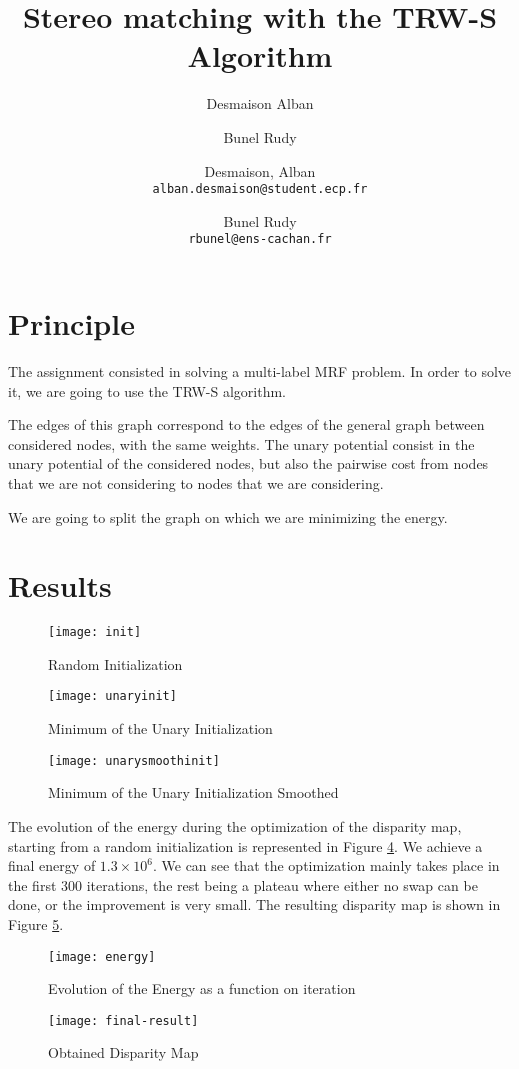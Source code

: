 \documentclass [11pt]{article}
\title{Stereo matching with the TRW-S Algorithm}
\author{Desmaison Alban \and Bunel Rudy}
\author{
  Desmaison, Alban\\
  \texttt{alban.desmaison@student.ecp.fr}
  \and
  Bunel Rudy\\
  \texttt{rbunel@ens-cachan.fr}
}
\begin{document}
\maketitle


\section{Principle}
The assignment consisted in solving a multi-label MRF problem. In order to solve it, we are going to use the TRW-S algorithm.

The edges of this graph correspond to the edges of the general graph between considered nodes, with the same weights. The unary potential consist in the unary potential of the considered nodes, but also the pairwise cost from nodes that we are not considering to nodes that we are considering.

 We are going to split the graph on which we are minimizing the energy.

\section{Results}

\begin{figure}[htbp]
  \centering
  \texttt{[image: init]}
  \caption{Random Initialization}
  \label{fig:randominit}
\end{figure}

\begin{figure}[htbp]
  \centering
  \texttt{[image: unaryinit]}
  \caption{Minimum of the Unary Initialization}
  \label{fig:unaryinit}
\end{figure}

\begin{figure}[htbp]
  \centering
  \texttt{[image: unarysmoothinit]}
  \caption{Minimum of the Unary Initialization Smoothed}
  \label{fig:unarysmoothinit}
\end{figure}


The evolution of the energy during the optimization of the disparity map, starting from a random initialization is represented in Figure \ref{fig:energy}. We achieve a final energy of $1.3 \times 10^6$. We can see that the optimization mainly takes place in the first 300 iterations, the rest being a plateau where either no swap can be done, or the improvement is very small. The resulting disparity map is shown in Figure \ref{fig:final-result}.

\begin{figure}[htbp]
  \centering
  \texttt{[image: energy]}
  \caption{Evolution of the Energy as a function on iteration}
  \label{fig:energy}
\end{figure}

\begin{figure}[htbp]
  \centering
  \texttt{[image: final-result]}
  \caption{Obtained Disparity Map}
  \label{fig:final-result}
\end{figure}
\end{document}
